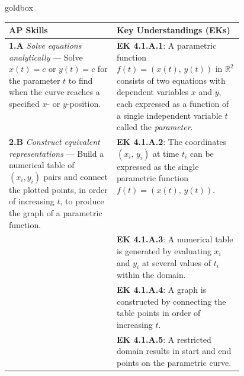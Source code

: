 \documentclass[10pt]{article}
\begin{document}
\begin{skillbox}{goldbox}
\begin{tabularx}{\linewidth}{@{} p{0.46\linewidth} X @{}}
\textbf{AP Skills} & \textbf{Key Understandings (EKs)} \\
\midrule
\textbf{1.A} \textit{Solve equations analytically} ---
  Solve $x(t) = c$ or $y(t) = c$ for the parameter $t$ to find when the
  curve reaches a specified $x$- or $y$-position.
&
\textbf{EK 4.1.A.1}: A parametric function $f(t) = (x(t),\, y(t))$ in
$\mathbb{R}^2$ consists of two equations with dependent variables $x$ and
$y$, each expressed as a function of a single independent variable $t$
called the \emph{parameter}. \\[4pt]

\textbf{2.B} \textit{Construct equivalent representations} ---
  Build a numerical table of $(x_i, y_i)$ pairs and connect the plotted
  points, in order of increasing $t$, to produce the graph of a
  parametric function.
&
\textbf{EK 4.1.A.2}: The coordinates $(x_i,\, y_i)$ at time $t_i$ can
be expressed as the single parametric function
$f(t) = (x(t),\, y(t))$. \\[4pt]

&
\textbf{EK 4.1.A.3}: A numerical table is generated by evaluating $x_i$
and $y_i$ at several values of $t_i$ within the domain. \\[4pt]

&
\textbf{EK 4.1.A.4}: A graph is constructed by connecting the table
points in order of increasing $t$. \\[4pt]

&
\textbf{EK 4.1.A.5}: A restricted domain results in start and end
points on the parametric curve. \\
\end{tabularx}
\end{skillbox}

\vspace{0.08in}
\end{document}
